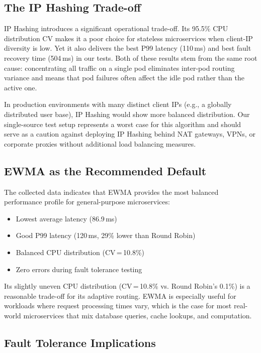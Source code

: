 \documentclass[conference]{IEEEtran}
\begin{document}
\subsection{The IP Hashing Trade-off}

IP Hashing introduces a significant operational trade-off. Its 95.5\% CPU distribution CV makes it a poor choice for stateless microservices when client-IP diversity is low. Yet it also delivers the best P99 latency (110\,ms) and best fault recovery time (504\,ms) in our tests. Both of these results stem from the same root cause: concentrating all traffic on a single pod eliminates inter-pod routing variance and means that pod failures often affect the idle pod rather than the active one.

In production environments with many distinct client IPs (e.g., a globally distributed user base), IP Hashing would show more balanced distribution. Our single-source test setup represents a worst case for this algorithm and should serve as a caution against deploying IP Hashing behind NAT gateways, VPNs, or corporate proxies without additional load balancing measures.

\subsection{EWMA as the Recommended Default}

The collected data indicates that EWMA provides the most balanced performance profile for general-purpose microservices:
\begin{itemize}
    \item Lowest average latency (86.9\,ms)
    \item Good P99 latency (120\,ms, 29\% lower than Round Robin)
    \item Balanced CPU distribution (CV\,=\,10.8\%)
    \item Zero errors during fault tolerance testing
\end{itemize}

Its slightly uneven CPU distribution (CV\,=\,10.8\% vs. Round Robin's 0.1\%) is a reasonable trade-off for its adaptive routing. EWMA is especially useful for workloads where request processing times vary, which is the case for most real-world microservices that mix database queries, cache lookups, and computation.

\subsection{Fault Tolerance Implications}
\end{document}
